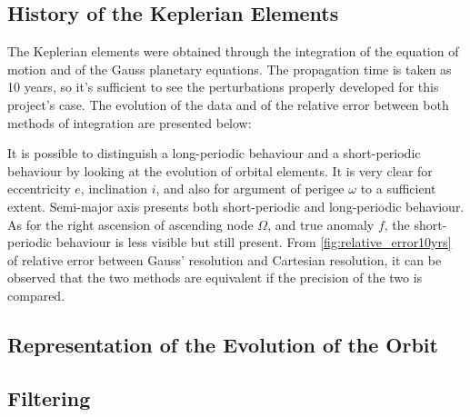 \subsection{History of the Keplerian Elements} 

The Keplerian elements were obtained through the integration of the equation of motion and of the Gauss planetary equations. The propagation time is taken as 10 years, so it's sufficient to see the perturbations properly developed for this project's case. The evolution of the data and of the relative error between both methods of integration are presented below:



It is possible to distinguish a long-periodic behaviour and a short-periodic behaviour by looking at the evolution of orbital elements. It is very clear for eccentricity \( e \), inclination \( i \), and also for argument of perigee \( \omega \) to a sufficient extent. Semi-major axis presents both short-periodic and long-periodic behaviour. As for the right ascension of ascending node \( \Omega \), and true anomaly \( f \), the short-periodic behaviour is less visible but still present. From \autoref{fig:relative_error10yrs} of relative error between Gauss’ resolution and Cartesian resolution, it can be observed that the two methods are equivalent if the precision of the two is compared.


\subsection{Representation of the Evolution of the Orbit}



\subsection{Filtering} 

